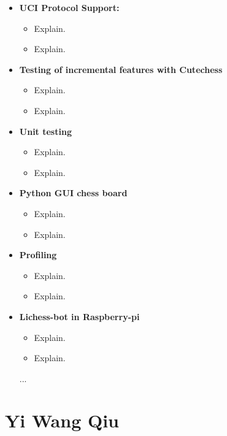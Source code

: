 \begin{itemize}
    \item \textbf{UCI Protocol Support:}
    \begin{itemize}
        \item Explain.
        \item Explain.
    \end{itemize}
  
    \item \textbf{Testing of incremental features with Cutechess}
    \begin{itemize}
        \item Explain.
        \item Explain.
    \end{itemize}

    \item \textbf{Unit testing}
    \begin{itemize}
        \item Explain.
        \item Explain.
    \end{itemize}

    \item \textbf{Python GUI chess board}
    \begin{itemize}
        \item Explain.
        \item Explain.
    \end{itemize}

    \item \textbf{Profiling}
    \begin{itemize}
        \item Explain.
        \item Explain.
    \end{itemize}

    \item \textbf{Lichess-bot in Raspberry-pi}
    \begin{itemize}
        \item Explain.
        \item Explain.
    \end{itemize}

    ...
\end{itemize}

\section*{Yi Wang Qiu}

